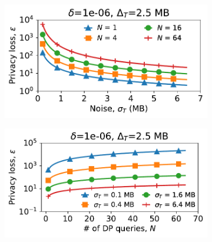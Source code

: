 \begin{figure}[t]
    \centering
    \begin{subfigure}{0.49\columnwidth}
        \centering
        \includegraphics[width=\textwidth]{privacy_loss_VS_noise_std_video_updated.pdf}
        \caption{}
        \label{subfig:high-sensitivity-epsilon-sigma}
    \end{subfigure}
    \hfill
    \begin{subfigure}{0.49\columnwidth}
        \centering
        \includegraphics[width=\textwidth]{privacy_loss_VS_query_num_video_updated.pdf}
        \caption{}
        \label{subfig:high-sensitivity-epsilon-queries}
    \end{subfigure}
    \caption{
    }
    \vspace{-0.4cm}
    \label{fig:privacy-microbenchmarks}
\end{figure}


